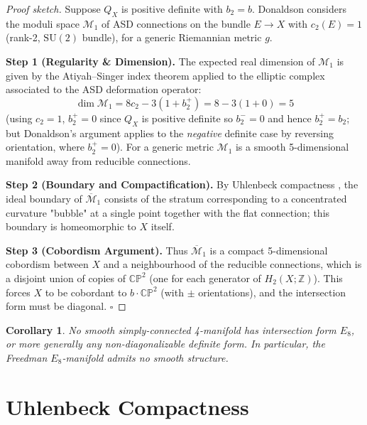 \documentclass[12pt,a4paper]{amsart}
\newtheorem{corollary}[theorem]{Corollary}
\theoremstyle{definition}
\theoremstyle{remark}
\newcommand{\CP}{\mathbb{CP}}
\newcommand{\ZZ}{\mathbb{Z}}
\begin{document}
\begin{proof}[Proof sketch]
Suppose $Q_X$ is positive definite with $b_2 = b$.  Donaldson considers the
moduli space $\mathcal{M}_1$ of ASD connections on the bundle $E \to X$ with
$c_2(E) = 1$ (rank-2, $\mathrm{SU}(2)$ bundle), for a generic Riemannian
metric $g$.

\medskip
\noindent\textbf{Step 1 (Regularity \& Dimension).}
The expected real dimension of $\mathcal{M}_1$ is given by the Atiyah--Singer
index theorem applied to the elliptic complex associated to the ASD
deformation operator:
\[
  \dim \mathcal{M}_1 = 8c_2 - 3(1 + b_2^+) = 8 - 3(1 + 0) = 5
\]
(using $c_2 = 1$, $b_2^+ = 0$ since $Q_X$ is positive definite so
$b_2^- = 0$ and hence $b_2^+ = b_2$; but Donaldson's argument applies
to the \emph{negative} definite case by reversing orientation, where
$b_2^+ = 0$).  For a generic metric $\mathcal{M}_1$ is a
smooth 5-dimensional manifold away from reducible connections.

\medskip
\noindent\textbf{Step 2 (Boundary and Compactification).}
By Uhlenbeck compactness \cite{Uhlenbeck1982}, the ideal boundary of
$\overline{\mathcal{M}}_1$ consists of the stratum corresponding to a
concentrated curvature "bubble" at a single point together with the flat
connection; this boundary is homeomorphic to $X$ itself.

\medskip
\noindent\textbf{Step 3 (Cobordism Argument).}
Thus $\overline{\mathcal{M}}_1$ is a compact 5-dimensional cobordism between
$X$ and a neighbourhood of the reducible connections, which is a disjoint
union of copies of $\CP^2$ (one for each generator of $H_2(X;\ZZ)$).
This forces $X$ to be cobordant to $b \cdot \CP^2$ (with $\pm$ orientations),
and the intersection form must be diagonal. $\square$
\end{proof}

\begin{corollary}
No smooth simply-connected 4-manifold has intersection form $E_8$, or more
generally any non-diagonalizable definite form.  In particular, the
\emph{Freedman $E_8$-manifold} admits no smooth structure.
\end{corollary}

\section{Uhlenbeck Compactness}
\end{document}

